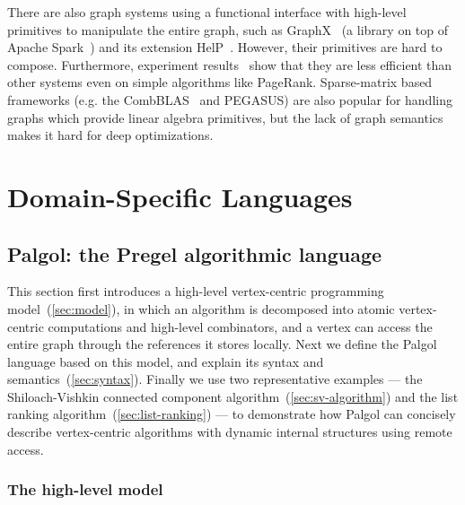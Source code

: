 \documentclass{sokendai_thesis} %
\begin{document}
There are also graph systems using a functional interface with high-level primitives to manipulate the entire graph, such as GraphX~\cite{graphx} (a library on top of Apache Spark~\cite{spark}) and its extension HelP~\cite{help}.
However, their primitives are hard to compose.
Furthermore, experiment results~\cite{husky} show that they are less efficient than other systems even on simple algorithms like PageRank.
Sparse-matrix based frameworks (e.g. the CombBLAS~\cite{combblas} and PEGASUS\cite{pegasus}) are also popular for handling graphs which provide linear algebra primitives, but the lack of graph semantics makes it hard for deep optimizations.


\chapter{Domain-Specific Languages}
\label{chap:dsl}

\section{Palgol: the Pregel algorithmic language}

This section first introduces a high-level vertex-centric programming model~(\autoref{sec:model}), in which an algorithm is decomposed into atomic vertex-centric computations and high-level combinators, and a vertex can access the entire graph through the references it stores locally.
Next we define the Palgol language based on this model, and explain its syntax and semantics~(\autoref{sec:syntax}).
Finally we use two representative examples --- the Shiloach-Vishkin connected component algorithm~(\autoref{sec:sv-algorithm}) and the list ranking algorithm~(\autoref{sec:list-ranking}) --- to demonstrate how Palgol can concisely describe vertex-centric algorithms with dynamic internal structures using remote access.

\subsection{The high-level model}
\label{sec:model}
\end{document}
